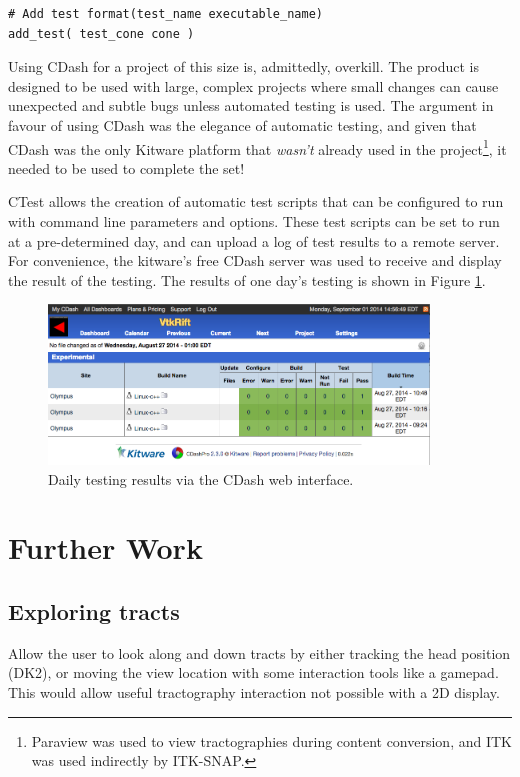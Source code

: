 \documentclass[MSc,paper=a4,pagesize=auto]{icldt}
\begin{document}
\begin{lstlisting}[label=setting_a_test, caption=Configuring a specific test]
# Add test format(test_name executable_name)
add_test( test_cone cone )
\end{lstlisting}

Using CDash for a project of this size is, admittedly, overkill. The product is designed to be used with large, complex projects where small changes can cause unexpected and subtle bugs unless automated testing is used. The argument in favour of using CDash was the elegance of automatic testing, and given that CDash was the only Kitware platform that \textit{wasn't} already used in the project\footnote{Paraview was used to view tractographies during content conversion, and ITK was used indirectly by ITK-SNAP.}, it needed to be used to complete the set!

CTest allows the creation of automatic test scripts that can be configured to run with command line parameters and options. These test scripts can be set to run at a pre-determined day, and can upload a log of test results to a remote server. For convenience, the kitware's free CDash server was used to receive and display the result of the testing. The results of one day's testing is shown in Figure \ref{fig:cdash_testing}. 

\begin{figure}[htbp!]
    \centering
    \includegraphics[width=0.9\textwidth]{resources/cdash_testing}
    \caption{Daily testing results via the CDash web interface.}
    \label{fig:cdash_testing}
\end{figure}

\section{Further Work}

\subsection{Exploring tracts}
Allow the user to look along and down tracts by either tracking the head position (DK2), or moving the view location with some interaction tools like a gamepad. This would allow useful tractography interaction not possible with a 2D display.
\end{document}
